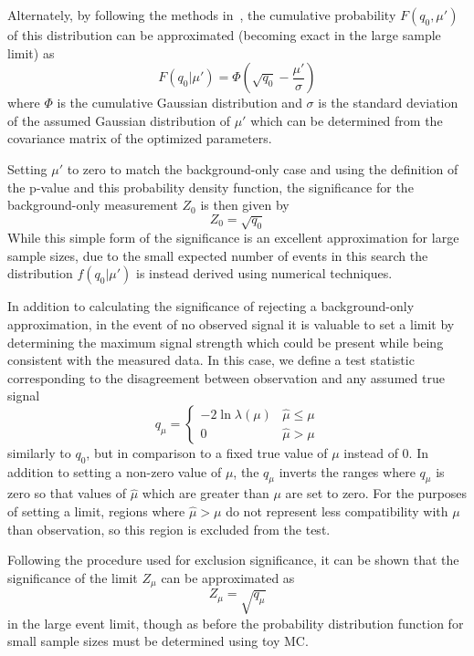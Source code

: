 Alternately, by following the methods in~\cite{Cowan_2011}, the cumulative probability $F(q_0,\mu')$ of this distribution can be approximated (becoming exact in the large sample limit) as 
\begin{equation}
	F(q_0|\mu') = \Phi \left( \sqrt{q_0} - \frac{\mu'}{\sigma} \right)
\end{equation}
where $\Phi$ is the cumulative Gaussian distribution and $\sigma$ is the standard deviation of the assumed Gaussian distribution of $\mu'$ which can be determined from the covariance matrix of the optimized parameters.

Setting $\mu'$ to zero to match the background-only case and using the definition of the p-value and this probability density function, the significance for the background-only measurement $Z_0$ is then given by
\begin{equation}
	Z_0 = \sqrt{q_0}
\end{equation} 
While this simple form of the significance is an excellent approximation for large sample sizes, due to the small expected number of events in this search the distribution $f(q_0|\mu')$ is instead derived using numerical techniques.

In addition to calculating the significance of rejecting a background-only approximation, in the event of no observed signal it is valuable to set a limit by determining the maximum signal strength which could be present while being consistent with the measured data.
In this case, we define a test statistic corresponding to the disagreement between observation and any assumed true signal
\begin{equation}
    q_\mu = 
	\begin{cases} 
		-2 \ln \lambda(\mu) & \hat{\mu} \leq \mu\\
                 0                & \hat{\mu} > \mu 
        \end{cases}
\end{equation}
similarly to $q_0$, but in comparison to a fixed true value of $\mu$ instead of 0. 
In addition to setting a non-zero value of $\mu$, the $q_\mu$ inverts the ranges where $q_\mu$ is zero so that values of $\hat{\mu}$ which are greater than $\mu$ are set to zero.
For the purposes of setting a limit, regions where $\hat{\mu}>\mu$ do not represent less compatibility with $\mu$ than observation, so this region is excluded from the test.

Following the procedure used for exclusion significance, it can be shown that the significance of the limit $Z_\mu$ can be approximated as
\begin{equation}
	Z_\mu = \sqrt{q_\mu}
\end{equation}
in the large event limit, though as before the probability distribution function for small sample sizes must be determined using toy MC.

